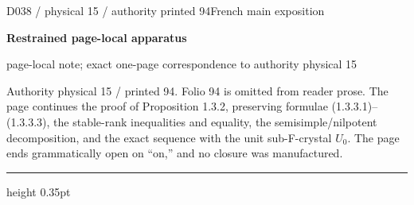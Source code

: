 \documentclass[9pt]{article}
\newcommand{\CanonText}[1]{\par{\fontsize{8.0}{9.35}\selectfont\RaggedRight #1\par}\vspace{2.2pt}}
\newcommand{\LayerTitle}{Restrained page-local apparatus}
\begin{document}
\noindent\begin{minipage}[t][\dimexpr\textheight-5pt\relax][t]{\textwidth}
{\sffamily\fontsize{7.3}{8.2}\selectfont\color{Quiet} D038 / physical 15 / authority printed 94\hfill French main exposition}
\par{}\vspace{4.5pt}
{\sffamily\fontsize{10.4}{11.6}\selectfont\bfseries\color{Accent} \LayerTitle}
\par{\sffamily\fontsize{6.7}{7.7}\selectfont\color{Quiet} page-local note; exact one-page correspondence to authority physical 15}
\vspace{5pt}
\CanonText{Authority physical 15 / printed 94. Folio 94 is omitted from reader prose. The page continues the proof of Proposition 1.3.2, preserving formulae (1.3.3.1)–(1.3.3.3), the stable-rank inequalities and equality, the semisimple/nilpotent decomposition, and the exact sequence with the unit sub-F-crystal \(U_{0}\). The page ends grammatically open on “on,” and no closure was manufactured.}
\vfill
{\color{Accent}\hrule height 0.35pt}\vspace{3pt}
\end{minipage}
\newpage
\end{document}
